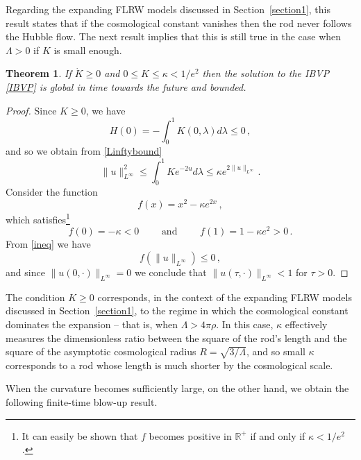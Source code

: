 \documentclass[10pt]{amsart}
\newcommand{\bbR}{\mathbb{R}}      %
\newtheorem{Thm}{Theorem}[section]
\begin{document}
Regarding the expanding FLRW models discussed in Section~\ref{section1}, this result states that if the cosmological constant vanishes then the rod never follows the Hubble flow. The next result implies that this is still true in the case when $\Lambda > 0$ if $K$ is small enough.

\begin{Thm} \label{globalintime}
If $\dot{K} \geq 0$ and $0 \leq K \leq \kappa < 1/e^2$ then the solution to the IBVP \eqref{IBVP} is global in time towards the future and bounded.
\end{Thm}

\begin{proof}
Since $K \geq 0$, we have
\begin{equation}
H(0) = - \int_0^1 K(0,\lambda) d\lambda \leq 0 \, ,
\end{equation}
and so we obtain from \eqref{Linftybound}
\begin{equation} \label{ineq}
\|u\|^2_{L^\infty} \leq \int_0^1 K e^{-2u} d\lambda \leq \kappa e^{2 \|u\|_{L^\infty}} \, .
\end{equation}
Consider the function
\begin{equation}
f(x) = x^2 - \kappa e^{2x} \, ,
\end{equation}
which satisfies\footnote{It can easily be shown that $f$ becomes positive in $\bbR^+$ if and only if $\kappa < 1/e^2$.}
\begin{equation}
f(0)=-\kappa < 0 \qquad \text{ and } \qquad f(1)=1-\kappa e^2 > 0 \, .
\end{equation}
From \eqref{ineq} we have
\begin{equation}
f(\|u\|_{L^\infty}) \leq 0 \, ,
\end{equation}
and since $\|u(0,\cdot)\|_{L^\infty}=0$ we conclude that $\|u(\tau,\cdot)\|_{L^\infty}<1$ for $\tau>0$.
\end{proof}

The condition $K \geq 0$ corresponds, in the context of the expanding FLRW models discussed in Section~\ref{section1}, to the regime in which the cosmological constant dominates the expansion -- that is, when $\Lambda > 4 \pi \rho$. In this case, $\kappa$ effectively measures the dimensionless ratio between the square of the rod’s length and the square of the asymptotic cosmological radius $R=\sqrt{3/\Lambda}$, and so small $\kappa$ corresponds to a rod whose length is much shorter by the cosmological scale.

When the curvature becomes sufficiently large, on the other hand, we obtain the following finite-time blow-up result.
\end{document}
